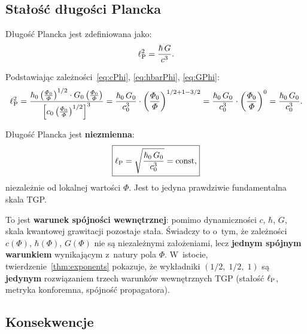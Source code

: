 \subsection{Sta\l{}o\'s\'c d\l{}ugo\'sci Plancka}\label{ssec:lP}\label{ssec:naturalunits}

D\l{}ugo\'s\'c Plancka jest zdefiniowana jako:
\begin{equation}
    \ell_{\mathrm{P}}^2 = \frac{\hbar\,G}{c^3}.
\end{equation}

Podstawiaj\k{a}c zale\.zno\'sci~\eqref{eq:cPhi}, \eqref{eq:hbarPhi},
\eqref{eq:GPhi}:
\begin{equation}
    \ell_{\mathrm{P}}^2
    = \frac{\hbar_0\left(\frac{\varPhi_0}{\varPhi}\right)^{1/2}
            \cdot G_0\left(\frac{\varPhi_0}{\varPhi}\right)}
           {\left[c_0\left(\frac{\varPhi_0}{\varPhi}\right)^{1/2}\right]^3}
    = \frac{\hbar_0\,G_0}{c_0^3}
      \cdot \left(\frac{\varPhi_0}{\varPhi}\right)^{1/2+1-3/2}
    = \frac{\hbar_0\,G_0}{c_0^3}
      \cdot \left(\frac{\varPhi_0}{\varPhi}\right)^{0}
    = \frac{\hbar_0\,G_0}{c_0^3}.
\end{equation}

\begin{theorem}\label{thm:lP}
D\l{}ugo\'s\'c Plancka jest \textbf{niezmienna}:
\begin{equation}\label{eq:lP-const}
    \boxed{\ell_{\mathrm{P}} = \sqrt{\frac{\hbar_0\,G_0}{c_0^3}} = \mathrm{const},}
\end{equation}
niezale\.znie od lokalnej warto\'sci $\Phi$. Jest to jedyna
prawdziwie fundamentalna skala TGP.
\end{theorem}

To jest \textbf{warunek sp\'ojno\'sci wewn\k{e}trznej}: pomimo
dynamiczno\'sci $c$, $\hbar$, $G$, skala kwantowej grawitacji
pozostaje sta\l{}a. \'Swiadczy to o~tym, \.ze zale\.zno\'sci
$c(\Phi)$, $\hbar(\Phi)$, $G(\Phi)$ nie s\k{a} niezale\.znymi
za\l{}o\.zeniami, lecz \textbf{jednym sp\'ojnym warunkiem}
wynikaj\k{a}cym z~natury pola $\Phi$.
W~istocie, twierdzenie~\ref{thm:exponents} pokazuje, \.ze
wyk\l{}adniki $(1/2,\;1/2,\;1)$ s\k{a} \textbf{jedynym}
rozwi\k{a}zaniem trzech warunk\'ow wewn\k{e}trznych TGP
(sta\l{}o\'s\'c $\ell_{\mathrm{P}}$, metryka konforemna, sp\'ojno\'s\'c
propagatora).

\subsection{Konsekwencje}\label{ssec:stale-kons}

